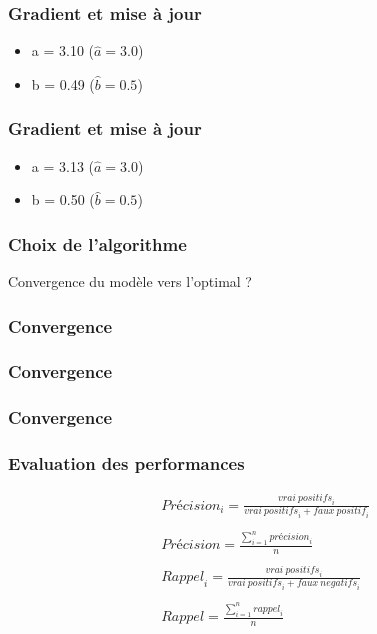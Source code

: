 \documentclass{formation}
\begin{document}
\begin{frame}
  \frametitle{Gradient et mise à jour}
  \begin{itemize}
  \item a = 3.10 ($\hat{a} = 3.0$)
  \item b = 0.49 ($\hat{b} = 0.5$)
  \end{itemize}
\end{frame}

\begin{frame}
  \frametitle{Gradient et mise à jour}
  \begin{itemize}
  \item a = 3.13 ($\hat{a} = 3.0$)
  \item b = 0.50 ($\hat{b} = 0.5$)
  \end{itemize}
\end{frame}

\begin{frame}
  \frametitle{Choix de l'algorithme}
  Convergence du modèle vers l'optimal ?
\end{frame}

\begin{frame}
  \frametitle{Convergence}
\end{frame}

\begin{frame}
  \frametitle{Convergence}
\end{frame}

\begin{frame}
  \frametitle{Convergence}
\end{frame}

\begin{frame}
  \frametitle{Evaluation des performances}
  \begin{align*}
    &\mathit{Précision}_i = \frac{\mathit{vrai\:positifs}_i}{\mathit{vrai\:positifs}_i+\mathit{faux\:positif}_i} \\
    &\\
    &\mathit{Précision} = \frac{\sum\limits_{i=1}^n \mathit{précision}_i}{n} \\
    &\\
    &\mathit{Rappel}_i = \frac{\mathit{vrai\:positifs}_i}{\mathit{vrai\:positifs}_i+\mathit{faux\:negatifs}_i} \\
    &\\
    &\mathit{Rappel} = \frac{\sum\limits_{i=1}^n \mathit{rappel}_i}{n}
  \end{align*}
\end{frame}
\end{document}
